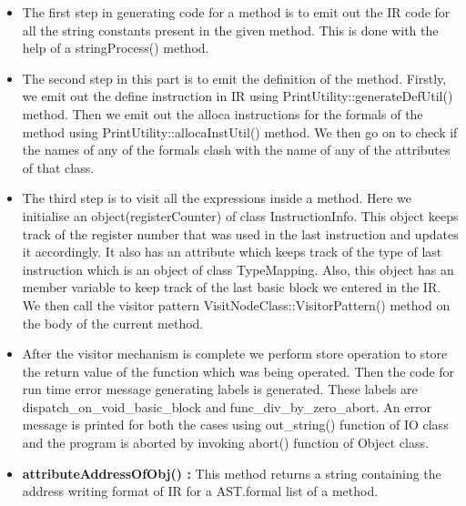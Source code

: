 \documentclass{article}
\begin{document}
\begin{itemize}

    \item The first step in generating code for a method is to emit out the IR code for all the string constants present in the given method. This is done with the help of a stringProcess() method.
    \item The second step in this part is to emit the definition of the method. Firstly, we emit out the define instruction in IR using PrintUtility::generateDefUtil() method. Then we emit out the alloca instructions for the formals of the method using PrintUtility::allocaInstUtil() method. We then go on to check if the names of any of the formals clash with the name of any of the attributes of that class.
    \item The third step is to visit all the expressions inside a method. Here we initialise an object(registerCounter) of class InstructionInfo. This object keeps track of the register number that was used in the last instruction and updates it accordingly. It also has an attribute which keeps track of the type of last instruction which is an object of class TypeMapping. Also, this object has an member variable to keep track of the last basic block we entered in the IR. We then call the visitor pattern VisitNodeClass::VisitorPattern() method on the body of the current method.
    \item After the visitor mechanism is complete we perform store operation to store the return value of the function which was being operated.
    Then the code for run time error message generating labels is generated. These labels are dispatch\_on\_void\_basic\_block and func\_div\_by\_zero\_abort. An error message is printed for both the cases using out\_string() function of IO class and the program is aborted by invoking abort() function of Object class.
    \item \textbf{attributeAddressOfObj() :} This method returns a string containing the address writing format of IR for a AST.formal list of a method.

\end{itemize} 
\end{document}
